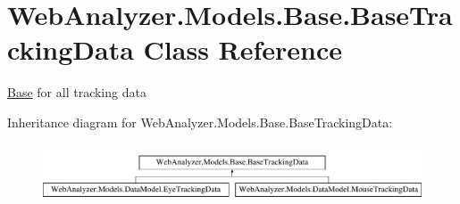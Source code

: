 \hypertarget{class_web_analyzer_1_1_models_1_1_base_1_1_base_tracking_data}{}\section{Web\+Analyzer.\+Models.\+Base.\+Base\+Tracking\+Data Class Reference}
\label{class_web_analyzer_1_1_models_1_1_base_1_1_base_tracking_data}


\hyperlink{namespace_web_analyzer_1_1_models_1_1_base}{Base} for all tracking data  


Inheritance diagram for Web\+Analyzer.\+Models.\+Base.\+Base\+Tracking\+Data\+:\begin{figure}[H]
\begin{center}
\leavevmode
\includegraphics[height=1.733746cm]{class_web_analyzer_1_1_models_1_1_base_1_1_base_tracking_data}
\end{center}
\end{figure}
